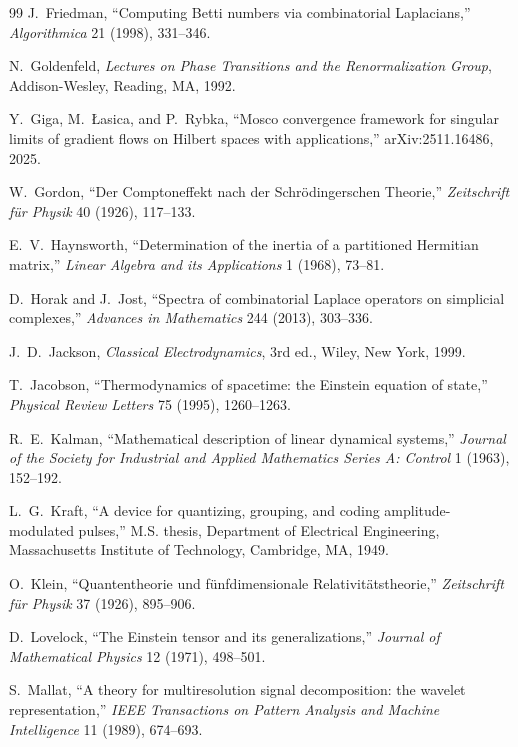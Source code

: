 \begin{thebibliography}{99}
J.~Friedman,
``Computing Betti numbers via combinatorial Laplacians,''
\emph{Algorithmica} 21 (1998), 331--346.

N.~Goldenfeld,
\emph{Lectures on Phase Transitions and the Renormalization Group},
Addison-Wesley, Reading, MA, 1992.

Y.~Giga, M.~\L{}asica, and P.~Rybka,
``Mosco convergence framework for singular limits of gradient flows on Hilbert
spaces with applications,''
arXiv:2511.16486, 2025.

W.~Gordon,
``Der Comptoneffekt nach der Schr\"odingerschen Theorie,''
\emph{Zeitschrift f\"ur Physik} 40 (1926), 117--133.

E.~V.~Haynsworth,
``Determination of the inertia of a partitioned Hermitian matrix,''
\emph{Linear Algebra and its Applications} 1 (1968), 73--81.

D.~Horak and J.~Jost,
``Spectra of combinatorial Laplace operators on simplicial complexes,''
\emph{Advances in Mathematics} 244 (2013), 303--336.

J.~D.~Jackson,
\emph{Classical Electrodynamics},
3rd ed., Wiley, New York, 1999.

T.~Jacobson,
``Thermodynamics of spacetime: the Einstein equation of state,''
\emph{Physical Review Letters} 75 (1995), 1260--1263.

R.~E.~Kalman,
``Mathematical description of linear dynamical systems,''
\emph{Journal of the Society for Industrial and Applied Mathematics Series A: Control}
1 (1963), 152--192.

L.~G.~Kraft,
``A device for quantizing, grouping, and coding amplitude-modulated pulses,''
M.S. thesis, Department of Electrical Engineering, Massachusetts Institute of
Technology, Cambridge, MA, 1949.

O.~Klein,
``Quantentheorie und f\"unfdimensionale Relativit\"atstheorie,''
\emph{Zeitschrift f\"ur Physik} 37 (1926), 895--906.

D.~Lovelock,
``The Einstein tensor and its generalizations,''
\emph{Journal of Mathematical Physics} 12 (1971), 498--501.

S.~Mallat,
``A theory for multiresolution signal decomposition: the wavelet representation,''
\emph{IEEE Transactions on Pattern Analysis and Machine Intelligence} 11 (1989), 674--693.


\end{thebibliography}

